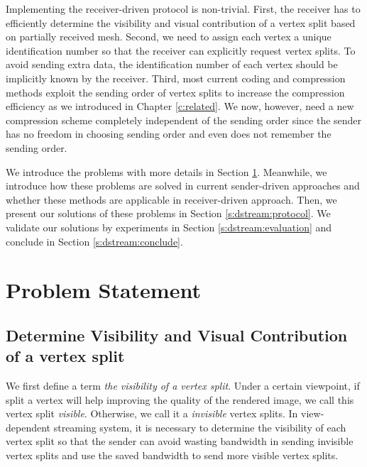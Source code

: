     Implementing the receiver-driven protocol is non-trivial. 
    First, the receiver has to efficiently determine the visibility and visual contribution
    of a vertex split based on partially received mesh. 
    Second, we need to assign each vertex a unique identification number
    so that the receiver can explicitly request vertex splits. 
    To avoid sending extra data, the identification number of each vertex 
    should be implicitly known by the receiver.
    Third, most current coding and compression methods exploit the sending order of vertex splits
    to increase the compression efficiency as we introduced in Chapter \ref{c:related}.
    We now, however, need a new compression scheme
    completely independent of the sending order since the sender has no freedom in choosing sending order
    and even does not remember the sending order.

    We introduce the problems with more details in Section \ref{s:dstream:terms}. 
    Meanwhile, we introduce how these problems are solved in current sender-driven approaches and 
    whether these methods are applicable in receiver-driven approach.
    Then, we present our solutions of these problems in Section \ref{s:dstream:protocol}.
    We validate our solutions by experiments in Section \ref{s:dstream:evaluation} 
    and conclude in Section \ref{s:dstream:conclude}.

\section{Problem Statement}
\label{s:dstream:terms}
    \subsection{Determine Visibility and Visual Contribution of a vertex split}
    We first define a term \emph{the visibility of a vertex split}. Under a certain
    viewpoint, if split a vertex will help improving the quality of the rendered image,
    we call this vertex split \emph{visible}. Otherwise, we call it a \emph{invisible}
    vertex splits.
    In view-dependent streaming system, it is necessary to determine the visibility
    of each vertex split so that the sender can avoid wasting bandwidth in sending invisible 
    vertex splits and use the saved bandwidth to send more visible vertex splits.

